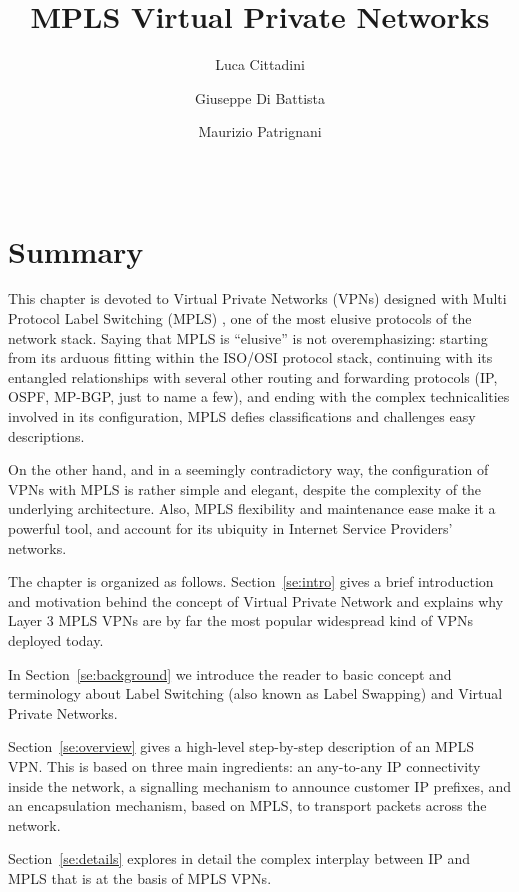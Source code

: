 \documentclass{article}
\begin{document}
\title{MPLS Virtual Private Networks}

\author{Luca Cittadini \and Giuseppe Di Battista \and Maurizio Patrignani}

\date{~}

\maketitle

\section*{Summary}
This chapter is devoted to Virtual Private Networks (VPNs) designed with Multi 
Protocol Label Switching (MPLS) \cite{rfc4364,rfc3031,rfc5036}, one of the most 
elusive protocols of the network stack. Saying that MPLS is ``elusive'' is not 
overemphasizing: starting from its arduous fitting within the ISO/OSI protocol 
stack, continuing with its entangled relationships with several other routing 
and forwarding protocols (IP, OSPF, MP-BGP, just to name a few), and ending with 
the complex technicalities involved in its configuration, MPLS defies 
classifications and challenges easy descriptions. 

On the other hand, and in a seemingly contradictory way, the configuration of 
VPNs with MPLS is rather simple and elegant, despite the complexity of the 
underlying architecture. Also, MPLS flexibility and maintenance ease 
make it a powerful tool, and account for its ubiquity in Internet Service 
Providers' networks.

The chapter is organized as follows. Section~\ref{se:intro} gives a brief introduction and
motivation behind the concept of Virtual Private Network and explains why Layer 3 MPLS VPNs
are by far the most popular widespread kind of VPNs deployed today.

In Section~\ref{se:background} we introduce the reader to basic concept and terminology
about Label Switching (also known as Label Swapping) and Virtual Private Networks.

Section~\ref{se:overview} gives a high-level step-by-step description of an MPLS VPN. This is based on three main ingredients: an any-to-any IP connectivity inside the
network, a signalling mechanism to announce customer IP prefixes, and an encapsulation
mechanism, based on MPLS, to transport packets across the network.

Section~\ref{se:details} explores in detail the complex interplay between IP and MPLS that
is at the basis of MPLS VPNs.
\end{document}
